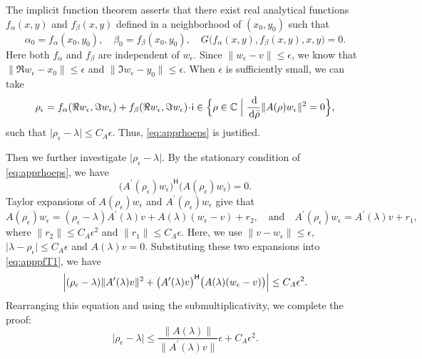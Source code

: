 \documentclass[a4paper,11pt]{article}
\newcommand{\Htran}{\mathsf{H}}
\newcommand{\de}{\,\mathrm{d}}
\newcommand{\mi}{\!\cdot\!\mathsf{i}}
\newcommand{\C}{\mathbb{C}}
\providecommand{\abs}[1]{\lvert#1\rvert}
\providecommand{\norm}[1]{\lVert#1\rVert}
\providecommand{\Bigabs}[1]{\Bigl\lvert#1\Bigr\rvert}
\begin{document}
The implicit function theorem asserts that there exist real analytical functions $f_{\alpha}(x,y)$ and $f_{\beta}(x,y)$ defined in a neighborhood of $(x_{0},y_{0})$ such that 
\begin{equation*}
    \alpha_{0}=f_{\alpha}(x_{0},y_{0}),\quad 
    \beta_{0}=f_{\beta}(x_{0},y_{0}),\quad 
    G\bigl(f_{\alpha}(x,y),f_{\beta}(x,y),x,y\bigr) = 0.
\end{equation*}
Here both $f_{\alpha}$ and $f_{\beta}$ are independent of $w_{\epsilon}$.
Since $\norm{w_{\epsilon}-v}\leq \epsilon$, we know that $\norm{\Re w_{\epsilon}-x_{0}}\leq \epsilon$ and $\norm{\Im w_{\epsilon}-y_{0}}\leq \epsilon$. When $\epsilon$ is sufficiently small, we can take 
\begin{equation*}
    \rho_{\epsilon} = f_{\alpha}(\Re w_{\epsilon},\Im w_{\epsilon})+f_{\beta}(\Re w_{\epsilon},\Im w_{\epsilon})\mi \in \Bigl\{ \rho\in\C \Bigm\vert \frac{\de }{\de \bar{\rho}} \norm{A(\rho)w_{\epsilon}}^{2} = 0  \Bigr\},
\end{equation*}
such that $\abs{\rho_{\epsilon}-\lambda}\leq C_{A}\epsilon$. Thus, \cref{eq:apprhoeps} is justified.

Then we further investigate $\abs{\rho_{\epsilon}-\lambda}$. By the stationary condition of \cref{eq:apprhoeps}, we have 
\begin{equation}
    \label{eq:apppfT1}
    \bigl(A^{\prime}(\rho_{\epsilon})w_{\epsilon}\bigr)^{\Htran}\bigl(A(\rho_{\epsilon})w_{\epsilon}\bigr) = 0.
\end{equation}
Taylor expansions of $A(\rho_{\epsilon})w_{\epsilon}$ and $A^{\prime}(\rho_{\epsilon})w_{\epsilon}$ give that
\begin{equation*}
    A(\rho_{\epsilon})w_{\epsilon} = (\rho_{\epsilon}-\lambda)A^{\prime}(\lambda)v+A(\lambda)(w_{\epsilon}-v)+r_{2}, 
    \quad\text{and}\quad 
    A^{\prime}(\rho_{\epsilon})w_{\epsilon} = A^{\prime}(\lambda)v +r_{1},        
\end{equation*}
where $\norm{r_{2}}\leq C_{A}\epsilon^{2}$ and $\norm{r_{1}}\leq C_{A}\epsilon$. 
Here, we use $\norm{v-w_{\epsilon}}\leq \epsilon$, $\abs{\lambda-\rho_{\epsilon}}\leq C_{A}\epsilon$ and $A(\lambda)v=0$. 
Substituting these two expansions into \cref{eq:apppfT1}, we have 
\begin{equation*}
    \Bigabs{
    (\rho_{\epsilon}-\lambda)\norm{A^{\prime}(\lambda)v}^{2}+\bigl(A^{\prime}(\lambda)v\bigr)^{\Htran}\bigl(A(\lambda)(w_{\epsilon}-v)\bigr)} \leq C_{A}\epsilon^{2}.
\end{equation*}
Rearranging this equation and using the submultiplicativity, we complete the proof:
\begin{equation*}
    \abs{\rho_{\epsilon}-\lambda}\leq \frac{\norm{A(\lambda)}}{\norm{A^{\prime}(\lambda)v}}\epsilon+C_{A}\epsilon^{2}.
\end{equation*}
\end{document}
